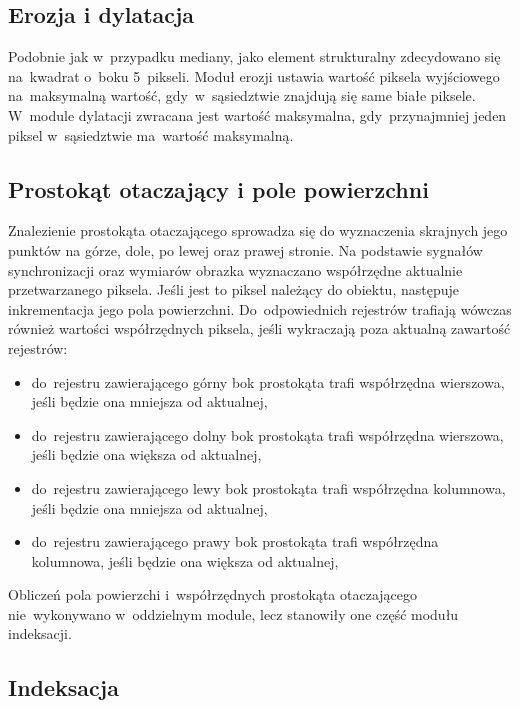 \subsection{Erozja i dylatacja}
\label{subsec:erozja}
Podobnie jak w~przypadku mediany, jako element strukturalny zdecydowano się na~kwadrat o~boku 5~pikseli. 
Moduł erozji ustawia wartość piksela wyjściowego na~maksymalną wartość, gdy~w~sąsiedztwie znajdują się same białe piksele. 
W~module dylatacji zwracana jest wartość maksymalna, gdy~przynajmniej jeden piksel w~sąsiedztwie ma~wartość maksymalną.

\subsection{Prostokąt otaczający i pole powierzchni}
\label{subsec:prostokat_otaczajacy}

Znalezienie prostokąta otaczającego sprowadza się do wyznaczenia skrajnych jego punktów na górze, dole, po lewej oraz prawej stronie. Na podstawie sygnałów synchronizacji oraz wymiarów obrazka wyznaczano współrzędne aktualnie przetwarzanego piksela. 
Jeśli jest to piksel należący do obiektu, następuje inkrementacja jego pola powierzchni. Do~odpowiednich rejestrów trafiają wówczas również wartości współrzędnych piksela, jeśli wykraczają poza aktualną zawartość rejestrów:
\begin{itemize}
	\item do~rejestru zawierającego górny bok prostokąta trafi współrzędna wierszowa, jeśli będzie ona mniejsza od aktualnej,
	\item do~rejestru zawierającego dolny bok prostokąta trafi współrzędna wierszowa, jeśli będzie ona większa od aktualnej,
	\item do~rejestru zawierającego lewy bok prostokąta trafi współrzędna kolumnowa, jeśli będzie ona mniejsza od aktualnej,
	\item do~rejestru zawierającego prawy bok prostokąta trafi współrzędna kolumnowa, jeśli będzie ona większa od aktualnej,
\end{itemize}  %
Obliczeń pola powierzchi i~współrzędnych prostokąta otaczającego nie~wykonywano w~oddzielnym module, lecz stanowiły one część modułu indeksacji.

\subsection{Indeksacja}
\label{subsec:indeksacja}

